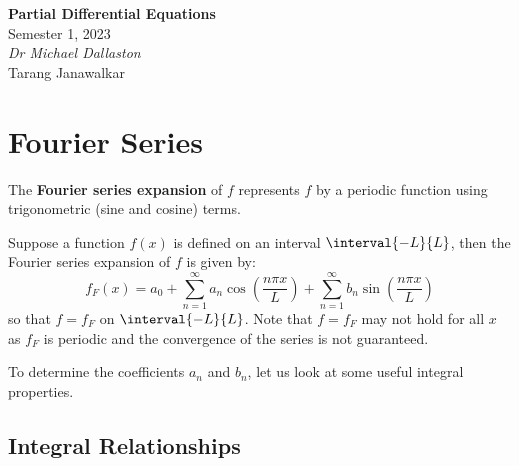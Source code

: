 \documentclass{article}
\date{}
\newcommand{\unitName}{Partial Differential Equations}
\newcommand{\unitTime}{Semester 1, 2023}
\newcommand{\unitCoordinator}{Dr Michael Dallaston}
\newcommand{\documentAuthors}{Tarang Janawalkar}
\begin{document}
%
\begin{titlepage}
    \vspace*{\fill}
    \begin{center}
        \LARGE{\textbf{\unitName}} \\[0.1in]
        \normalsize{\unitTime} \\[0.2in]
        \normalsize\textit{\unitCoordinator} \\[0.2in]
        \documentAuthors
    \end{center}
    \vspace*{\fill}
    \doclicenseThis
    \thispagestyle{empty}
\end{titlepage}
\newpage
%
\tableofcontents
\newpage
%
\section{Fourier Series}
\begin{definition}
    The \textbf{Fourier series expansion} of \(f\) represents \(f\) by a periodic function using trigonometric (sine and cosine) terms.

    Suppose a function \(f\left( x \right)\) is defined on an interval \(\interval{-L}{L}\), then
    the Fourier series expansion of \(f\) is given by:
    \begin{equation}\label{eq:fourier}
        f_F\left( x \right) = a_0 + \sum_{n = 1}^\infty a_n \cos{\left( \frac{n \pi x}{L} \right)} + \sum_{n = 1}^\infty b_n \sin{\left( \frac{n \pi x}{L} \right)}
    \end{equation}
    so that \(f = f_F\) on \(\interval{-L}{L}\). Note that \(f = f_F\) may not hold for all \(x\) as \(f_F\) is periodic and the convergence of the series is not guaranteed.
\end{definition}
To determine the coefficients \(a_n\) and \(b_n\), let us look at some useful integral properties.
\subsection{Integral Relationships}
\end{document}
